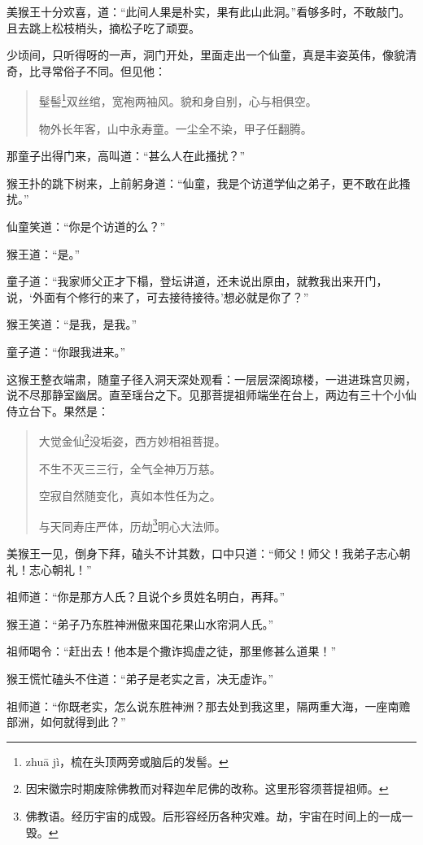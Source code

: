 \documentclass[12pt,UTF8]{ctexbook}
\begin{document}
美猴王十分欢喜，道：“此间人果是朴实，果有此山此洞。”看够多时，不敢敲门。且去跳上松枝梢头，摘松子吃了顽耍。

少顷间，只听得呀的一声，洞门开处，里面走出一个仙童，真是丰姿英伟，像貌清奇，比寻常俗子不同。但见他：

\begin{quotation}
髽髻\footnote{zhu\=a j\`i，梳在头顶两旁或脑后的发髻。}双丝绾，宽袍两袖风。貌和身自别，心与相俱空。

物外长年客，山中永寿童。一尘全不染，甲子任翻腾。
\end{quotation}

那童子出得门来，高叫道：“甚么人在此搔扰？”

猴王扑的跳下树来，上前躬身道：“仙童，我是个访道学仙之弟子，更不敢在此搔扰。”

仙童笑道：“你是个访道的么？”

猴王道：“是。”

童子道：“我家师父正才下榻，登坛讲道，还未说出原由，就教我出来开门，说，‘外面有个修行的来了，可去接待接待。’想必就是你了？”

猴王笑道：“是我，是我。”

童子道：“你跟我进来。”

这猴王整衣端肃，随童子径入洞天深处观看：一层层深阁琼楼，一进进珠宫贝阙，说不尽那静室幽居。直至瑶台之下。见那菩提祖师端坐在台上，两边有三十个小仙侍立台下。果然是：

\begin{quotation}
大觉金仙\footnote{因宋徽宗时期废除佛教而对释迦牟尼佛的改称。这里形容须菩提祖师。}没垢姿，西方妙相祖菩提。

不生不灭三三行，全气全神万万慈。

空寂自然随变化，真如本性任为之。

与天同寿庄严体，历劫\footnote{佛教语。经历宇宙的成毁。后形容经历各种灾难。劫，宇宙在时间上的一成一毁。}明心大法师。
\end{quotation}

美猴王一见，倒身下拜，磕头不计其数，口中只道：“师父！师父！我弟子志心朝礼！志心朝礼！”

祖师道：“你是那方人氏？且说个乡贯姓名明白，再拜。”

猴王道：“弟子乃东胜神洲傲来国花果山水帘洞人氏。”

祖师喝令：“赶出去！他本是个撒诈捣虚之徒，那里修甚么道果！”

猴王慌忙磕头不住道：“弟子是老实之言，决无虚诈。”

祖师道：“你既老实，怎么说东胜神洲？那去处到我这里，隔两重大海，一座南赡部洲，如何就得到此？”
\end{document}
